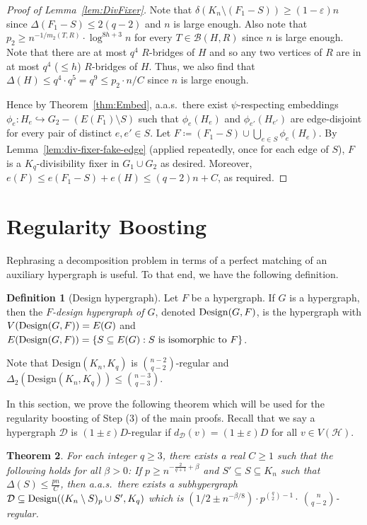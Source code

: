 \documentclass[11pt]{article}
\numberwithin{equation}{section}
\newcommand{\eps}{\varepsilon}
\newcommand{\mc}[1]{\mathcal{#1}}
\newcounter{i}
\theoremstyle{plain}
\newtheorem{thm}{Theorem}[section]
\theoremstyle{plain} %
\theoremstyle{definition}
\newtheorem{definition}[thm]{Definition}
\newcommand{\cD}{\mathcal{D}}
\newcommand{\cB}{\mathcal{B}}
\newcommand{\cH}{\mathcal{H}}
\newcommand{\aas}{a.a.s.\ }
\begin{document}
\begin{proof}[Proof of Lemma~\ref{lem:DivFixer}]
Note that $\delta(K_n\setminus (F_1 - S)) \ge (1-\varepsilon)n$ since $\Delta(F_1-S) \le 2 (q-2)$ and $n$ is large enough. Also note that $p_2 \geq n^{-1/m_2(T, R)}\cdot \log^{8h+3} n$ for every $T \in \cB(H, R)$ since $n$ is large enough. Note that there are at most $q^4$ $R$-bridges of $H$ and so any two vertices of $R$ are in at most $q^4$ ($\le h$) $R$-bridges of $H$. Thus, we also find that $\Delta(H) \le q^4\cdot q^5 = q^9 \le {p_2\cdot n}/{C}$ since $n$ is large enough. 

Hence by Theorem~\ref{thm:Embed}, \aas there exist $\psi$-respecting embeddings $\phi_e : H_e \hookrightarrow G_2 - (E(F_1)\setminus S)$ such that $\phi_e(H_e)$ and $\phi_{e'}(H_{e'})$ are edge-disjoint for every pair of distinct $e,e' \in S$.  Let $F \coloneqq (F_1 - S) \cup \bigcup_{e\in S}\phi_e(H_e)$.
By Lemma~\ref{lem:div-fixer-fake-edge} (applied repeatedly, once for each edge of $S$), $F$ is a $K_q$-divisibility fixer in $G_1\cup G_2$ as desired.
Moreover, $e(F) \leq e(F_1 - S) + e(H) \leq (q - 2)n + C$, as required.
\end{proof}

\section{Regularity Boosting}\label{s:Regularity}



Rephrasing a decomposition problem in terms 
of a perfect matching of an auxiliary hypergraph is useful. To that end, we have the following definition.

\begin{definition}[Design hypergraph]\label{def:design-hypergraph}
Let $F$ be a hypergraph. If $G$ is a hypergraph, then the \emph{$F$-design hypergraph of $G$}, denoted ${\rm Design}(G,F)$, %
is the hypergraph with $V({\rm Design}(G,F))=E(G)$ and $E({\rm Design}(G,F)) = \{S\subseteq E(G): S \text{ is isomorphic to } F\}$.
\end{definition}

Note that $\mathrm{Design}(K_n, K_q)$ is $\binom{n - 2}{q - 2}$-regular and $\Delta_2(\mathrm{Design}(K_n, K_q)) \leq \binom{n - 3}{q - 3}$.  

In this section, we prove the following theorem which will be used for the regularity boosting of Step (3) of the main proofs.
Recall that we say a hypergraph $\cD$ is $(1 \pm \eps)D$-regular if $d_{\cD}(v) = (1 \pm \eps)D$ for all $v \in V(\cH)$.

\begin{thm}\label{thm:RegularCliques}
For each integer $q \ge 3$, there exists a real $C \ge 1$ such that the following holds for all $\beta > 0$: If $p \ge n^{-\frac{2}{q+1} + \beta}$ and $S'\subseteq S\subseteq K_n$ such that $\Delta(S) \le \frac{pn}{C}$, then \aas there exists a subhypergraph $\mc{D} \subseteq {\rm Design}( (K_n\setminus S)_p\cup S',K_q)$ which is  $\left(1/2\pm n^{-\beta/8}\right)\cdot p^{\binom{q}{2}-1}\cdot~\binom{n}{q-2}$-regular.
\end{thm}
\end{document}
